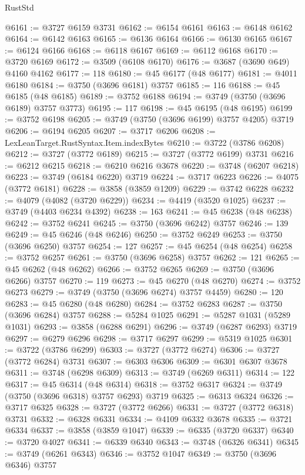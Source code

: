 \begin{lexlean}{RustStd}
\begin{coremodule}
@6161 := @3727 @6159 @3731
@6162 := @6154 @6161
@6163 := @6148 @6162
@6164 := @6142 @6163
@6165 := @6136 @6164
@6166 := @6130 @6165
@6167 := @6124 @6166
@6168 := @6118 @6167
@6169 := @6112 @6168
@6170 := @3720 @6169
@6172 := @3509 (@6108 @6170)
@6176 := @3687 (@3690 @649) @4160 @4162
@6177 := 118
@6180 := @45 @6177 (@48 @6177)
@6181 := @4011 @6180
@6184 := @3750 (@3696 @6181) @3757
@6185 := 116
@6188 := @45 @6185 (@48 @6185)
@6189 := @3752 @6188
@6194 := @3749 (@3750 (@3696 @6189) @3757 @3773)
@6195 := 117
@6198 := @45 @6195 (@48 @6195)
@6199 := @3752 @6198
@6205 := @3749 (@3750 (@3696 @6199) @3757 @4205) @3719
@6206 := @6194 @6205
@6207 := @3717 @6206
@6208 := LexLeanTarget.RustSyntax.Item.indexBytes
@6210 := @3722 (@3786 @6208)
@6212 := @3727 (@3772 @6189)
@6215 := @3727 (@3772 @6199) @3731
@6216 := @6212 @6215
@6218 := @6210 @6216 @3678
@6220 := @3748 (@6207 @6218)
@6223 := @3749 (@6184 @6220) @3719
@6224 := @3717 @6223
@6226 := @4075 (@3772 @6181)
@6228 := @3858 (@3859 @1209)
@6229 := @3742 @6228
@6232 := @4079 (@4082 (@3720 @6229))
@6234 := @4419 (@3520 @1025)
@6237 := @3749 (@4403 @6234 @4392)
@6238 := 163
@6241 := @45 @6238 (@48 @6238)
@6242 := @3752 @6241
@6245 := @3750 (@3696 @6242) @3757
@6246 := 139
@6249 := @45 @6246 (@48 @6246)
@6250 := @3752 @6249
@6253 := @3750 (@3696 @6250) @3757
@6254 := 127
@6257 := @45 @6254 (@48 @6254)
@6258 := @3752 @6257
@6261 := @3750 (@3696 @6258) @3757
@6262 := 121
@6265 := @45 @6262 (@48 @6262)
@6266 := @3752 @6265
@6269 := @3750 (@3696 @6266) @3757
@6270 := 119
@6273 := @45 @6270 (@48 @6270)
@6274 := @3752 @6273
@6279 := @3749 (@3750 (@3696 @6274) @3757 @4459)
@6280 := 120
@6283 := @45 @6280 (@48 @6280)
@6284 := @3752 @6283
@6287 := @3750 (@3696 @6284) @3757
@6288 := @5284 @1025
@6291 := @5287 @1031 (@5289 @1031)
@6293 := @3858 (@6288 @6291)
@6296 := @3749 (@6287 @6293) @3719
@6297 := @6279 @6296
@6298 := @3717 @6297
@6299 := @5319 @1025
@6301 := @3722 (@3786 @6299)
@6303 := @3727 (@3772 @6274)
@6306 := @3727 (@3772 @6284) @3731
@6307 := @6303 @6306
@6309 := @6301 @6307 @3678
@6311 := @3748 (@6298 @6309)
@6313 := @3749 (@6269 @6311)
@6314 := 122
@6317 := @45 @6314 (@48 @6314)
@6318 := @3752 @6317
@6324 := @3749 (@3750 (@3696 @6318) @3757 @6293) @3719
@6325 := @6313 @6324
@6326 := @3717 @6325
@6328 := @3727 (@3772 @6266)
@6331 := @3727 (@3772 @6318) @3731
@6332 := @6328 @6331
@6334 := @4109 @6332 @3678
@6335 := @3721 @6334
@6337 := @3858 (@3859 @1047)
@6339 := @6335 (@3720 @6337)
@6340 := @3720 @4027
@6341 := @6339 @6340
@6343 := @3748 (@6326 @6341)
@6345 := @3749 (@6261 @6343)
@6346 := @3752 @1047
@6349 := @3750 (@3696 @6346) @3757

\end{coremodule}
\end{lexlean}
